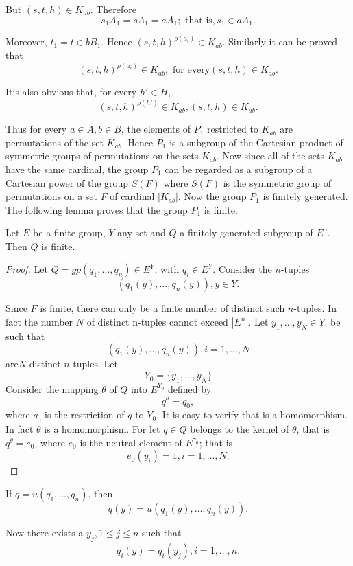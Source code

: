 But $(s,t,h)\in  K_{ab}$. Therefore
$$
s_1A_1=sA_1=aA_1; \text{ that is}, s_1 \in  aA_1.
$$

Moreover, $t_1=t \in  bB_1$. Hence
$(s,t,h)^{\rho(a_i)}\in  K_{ab}$. Similarly it can be proved
that 
$$ 
(s,t,h)^{\rho(a_i)}\in  K_{ab}, \text{ for every
}(s,t,h)\in  K_{ab}. 
$$

It\pageoriginale is also obvious that, for every $h' \in  H$,
$$
(s,t,h)^{\rho(h')}\in  K_{ab}, (s,t,h)\in  K_{ab}.
$$

Thus for every $a \in  A,b \in  B$, the elements of
$P_1$ restricted to $K_{ab}$ are permutations of the set
$K_{ab}$. Hence $P_1$ is a subgroup of the Cartesian product of
symmetric groups of permutations on the sets $K_{ab}$. Now since all
of the sets $K_{ab}$ have the same cardinal, the group $P_1$ can be
regarded as a subgroup of a Cartesian power of the group $S(F)$
where $S(F)$ is the
symmetric group of permutations on a set $F$ of cardinal
$|K_{ab}|$. Now the group $P_1$ is finitely generated. The following
lemma proves that the group $P_1$ is finite. 

\begin{lemma*}
  Let $E$ be a finite group, $Y$ any set and $Q$ a finitely generated
  subgroup of $E^\gamma$. Then $Q$ is finite. 
\end{lemma*}

\begin{proof}
  Let $Q=gp(q_1, \ldots, q_n)\in  E^Y$, with $q_i \in 
  E^Y$. Consider the $n$-tuples 
  $$
  (q_1(y), \ldots, q_n(y)),y \in  Y.
  $$

  Since $F$ is finite, there can only be a finite number of distinct
  such $n$-tuples. In fact the number $N$ of distinct n-tuples cannot
  exceed $|E^n|$. Let $y_1,\ldots, y_N \in  Y$. be such that 
  $$
  (q_1(y), \ldots, q_n(y)),i=1,\ldots,N
  $$
  are\pageoriginale $N$ distinct $n$-tuples. Let
  $$
  Y_0= \bigg \{ y_1,\ldots, y_N \bigg \}
  $$
  Consider the mapping $\theta$ of $Q$ into $E^{Y_0}$ defined by 
  $$
  q^\theta=q_0,
  $$
  where $q_0$ is the restriction of $q$ to $Y_0$. It is easy to verify
  that is a homomorphism. In fact $\theta$ is a homomorphism. For let
  $q \in  Q$ belongs to the kernel of $\theta$, that is
  $q^\theta=e_0$, where $e_0$ is the neutral element of $E^{\gamma_0}$;
  that is  
  $$
  e_0(y_i)=1, i=1, \ldots, N.
  $$
\end{proof}

If $q=u(q_1, \ldots, q_n)$, then
$$
q(y)=u(q_1(y), \ldots, q_n (y)).
$$

Now there exists a $y_j,1\leq j \leq n$ such that
$$
q_i(y)=q_i(y_j),i=1, \ldots, n.
$$

